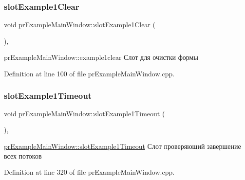 \mbox{\label{classpr_example_main_window_abd4dfff0de439f5afc286425a0508add}} 
\subsubsection{\texorpdfstring{slot\+Example1\+Clear}{slotExample1Clear}}
{\footnotesize\ttfamily void pr\+Example\+Main\+Window\+::slot\+Example1\+Clear (\begin{DoxyParamCaption}{ }\end{DoxyParamCaption})\hspace{0.3cm}{\ttfamily [private]}, {\ttfamily [slot]}}



pr\+Example\+Main\+Window\+::example1clear Слот для очистки формы 



Definition at line 100 of file pr\+Example\+Main\+Window.\+cpp.

\mbox{\label{classpr_example_main_window_a8575434cfb2b50fd78f73a8b06c43a1e}} 
\subsubsection{\texorpdfstring{slot\+Example1\+Timeout}{slotExample1Timeout}}
{\footnotesize\ttfamily void pr\+Example\+Main\+Window\+::slot\+Example1\+Timeout (\begin{DoxyParamCaption}{ }\end{DoxyParamCaption})\hspace{0.3cm}{\ttfamily [private]}, {\ttfamily [slot]}}



\hyperlink{classpr_example_main_window_a8575434cfb2b50fd78f73a8b06c43a1e}{pr\+Example\+Main\+Window\+::slot\+Example1\+Timeout} Слот проверяющий завершение всех потоков 



Definition at line 320 of file pr\+Example\+Main\+Window.\+cpp.

